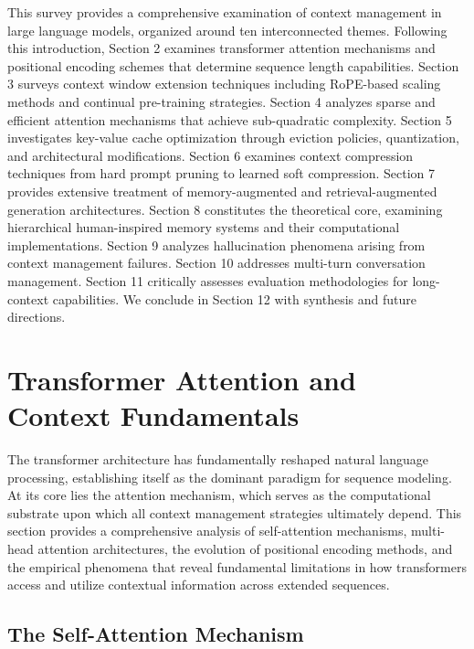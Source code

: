 \documentclass[11pt,letterpaper]{article}
\begin{document}
This survey provides a comprehensive examination of context management in large language models, organized around ten interconnected themes. Following this introduction, Section 2 examines transformer attention mechanisms and positional encoding schemes that determine sequence length capabilities. Section 3 surveys context window extension techniques including RoPE-based scaling methods and continual pre-training strategies. Section 4 analyzes sparse and efficient attention mechanisms that achieve sub-quadratic complexity. Section 5 investigates key-value cache optimization through eviction policies, quantization, and architectural modifications. Section 6 examines context compression techniques from hard prompt pruning to learned soft compression. Section 7 provides extensive treatment of memory-augmented and retrieval-augmented generation architectures. Section 8 constitutes the theoretical core, examining hierarchical human-inspired memory systems and their computational implementations. Section 9 analyzes hallucination phenomena arising from context management failures. Section 10 addresses multi-turn conversation management. Section 11 critically assesses evaluation methodologies for long-context capabilities. We conclude in Section 12 with synthesis and future directions.

\section{Transformer Attention and Context Fundamentals}
\label{sec:attention}

The transformer architecture has fundamentally reshaped natural language processing, establishing itself as the dominant paradigm for sequence modeling. At its core lies the attention mechanism, which serves as the computational substrate upon which all context management strategies ultimately depend. This section provides a comprehensive analysis of self-attention mechanisms, multi-head attention architectures, the evolution of positional encoding methods, and the empirical phenomena that reveal fundamental limitations in how transformers access and utilize contextual information across extended sequences.

\subsection{The Self-Attention Mechanism}
\end{document}
